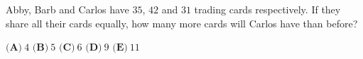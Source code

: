 Abby, Barb and Carlos have $35$, $42$ and $31$ trading cards respectively. If they share all their cards equally, how many more cards will Carlos have than before?

$\textbf{(A)}\ $$4$ \qquad $\textbf{(B)}\ $$5$ \qquad $\textbf{(C)}\ $$6$ \qquad $\textbf{(D)}\ $$9$ \qquad $\textbf{(E)}\ $$11$
